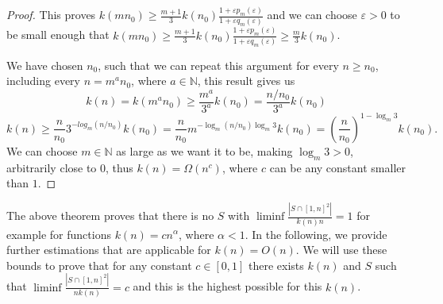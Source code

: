 \documentclass[11pt,a4paper]{article}
\numberwithin{equation}{section}
\newcommand{\nn}{\mathbb{N}}
\begin{document}
\begin{proof}
 This proves $k(mn_0)\ge\frac{m+1}{3}k(n_0)\frac{1+\varepsilon p_m(\varepsilon)}{1+\varepsilon q_m(\varepsilon)}$ and we can choose $\varepsilon>0$ to be small enough that $k(mn_0)\ge\frac{m+1}{3}k(n_0)\frac{1+\varepsilon p_m(\varepsilon)}{1+\varepsilon q_m(\varepsilon)}\ge\frac{m}{3}k(n_0)$.

 We have chosen $n_0$, such that we can repeat this argument for every $n\ge n_0$, including every $n=m^an_0$, where $a\in\nn$, this result gives us 
$$k(n)= k(m^an_0)\ge\frac{m^a}{3^a}k(n_0)=\frac{n/n_0}{3^a}k(n_0)$$
$$k(n)\ge\frac{n}{n_0}3^{-log_m(n/n_0)}k(n_0)=\frac{n}{n_0}m^{-\log_m(n/n_0)\log_m3}k(n_0)=\left(\frac{n}{n_0}\right)^{1-\log_m3}k(n_0).$$
We can choose $m\in  \nn$ as large as we want it to be, making $\log_m3>0$, arbitrarily close to 0, thus $k(n)=\Omega(n^c)$, where $c$ can be any constant smaller than $1$.

\end{proof}

The above theorem proves that there is no $S$ with $\liminf\frac{|S\cap[1,n]^2|}{k(n) n}=1$ for example for functions $k(n)=c n^{\alpha}$, where $\alpha<1$. In the following, we provide further estimations that are applicable for $k(n)= O(n)$. We will use these bounds to prove that for any constant $c\in[0,1]$ there exists $k(n)$ and $S$ such that $\liminf \frac{|S \cap [1,n]^2|}{n k(n)}=c$ and this is the highest possible for this $k(n)$.
\end{document}
